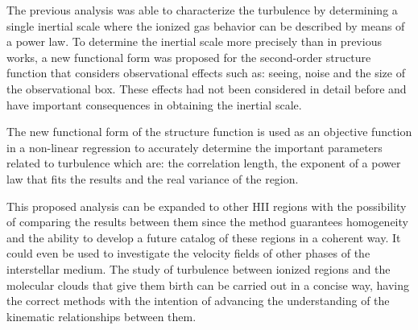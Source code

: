 \documentclass[fleqn,usenatbib, useAMS, a4paper]{mnras}
\begin{document}
The previous analysis was able to characterize the turbulence by determining a single inertial scale where the ionized gas behavior can be described by means of a power law.
To determine the inertial scale more precisely than in previous works, a new functional form was proposed for the second-order structure function that considers observational effects such as: seeing, noise and the size of the observational box.
These effects had not been considered in detail before and have important consequences in obtaining the inertial scale.

The new functional form of the structure function is used as an objective function in a non-linear regression to accurately determine the important parameters related to turbulence which are: the correlation length, the exponent of a power law that fits the results and the real variance of the region.

This proposed analysis can be expanded to other HII regions with the possibility of comparing the results between them since the method guarantees homogeneity and the ability to develop a future catalog of these regions in a coherent way.
It could even be used to investigate the velocity fields of other phases of the interstellar medium.
The study of turbulence between ionized regions and the molecular clouds that give them birth can be carried out in a concise way, having the correct methods with the intention of advancing the understanding of the kinematic relationships between them.
\end{document}
